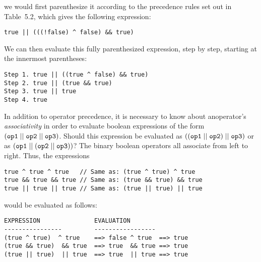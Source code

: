 \noindent we would first parenthesize it according to the
precedence rules set out in Table~5.2,
which gives the following expression:

\begin{jjjlisting}
\begin{lstlisting}
true || (((!false) ^ false) && true)
\end{lstlisting}
\end{jjjlisting}

\noindent We can then evaluate this fully parenthesized
expression, step by step, starting at the innermost
parentheses:

\begin{jjjlisting}
\begin{lstlisting}
Step 1. true || ((true ^ false) && true)
Step 2. true || (true && true)
Step 3. true || true
Step 4. true
\end{lstlisting}
\end{jjjlisting}


In addition to operator precedence, it is necessary to know about
an\break operator's {\it associativity} in order to evaluate boolean
expressions of the form ${\tt (op1 \mid\mid op2
\mid\mid op3)}$. Should this expression be evaluated as ${\tt ((op1
\mid\mid op2) \mid\mid op3)}$ or as ${\tt (op1 \mid\mid (op2 \mid\mid
op3))}$?  The binary boolean operators all associate from left to
right.  Thus, the  expressions

\begin{jjjlisting}
\begin{lstlisting}
true ^ true ^ true   // Same as: (true ^ true) ^ true
true && true && true // Same as: (true && true) && true
true || true || true // Same as: (true || true) || true
\end{lstlisting}
\end{jjjlisting}

\noindent would be evaluated as follows:

\begin{jjjlisting}
\begin{lstlisting}
EXPRESSION               EVALUATION
----------------         -----------------
(true ^ true)  ^ true    ==> false ^ true  ==> true
(true && true)  && true  ==> true  && true ==> true
(true || true)  || true  ==> true  || true ==> true
\end{lstlisting}
\end{jjjlisting}


